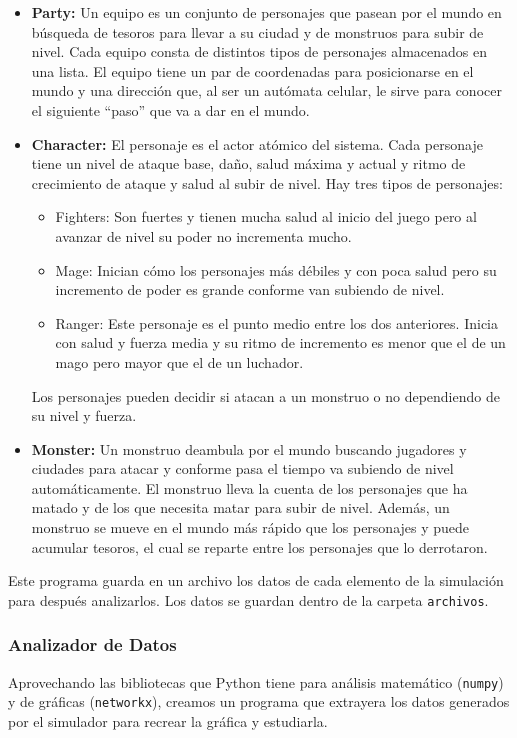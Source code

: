 {{\begin{itemize}
{            cuándo salen a buscar tesoros.
        }
        \item{\textbf{Party: }Un equipo es un conjunto de personajes que pasean
            por el mundo en búsqueda de tesoros para llevar a su ciudad y de
            monstruos para subir de nivel. Cada equipo consta de distintos
            tipos de personajes almacenados en una lista. El equipo tiene un par
            de coordenadas para posicionarse en el mundo y una dirección que, al
            ser un autómata celular, le sirve para conocer el siguiente ``paso''
            que va a dar en el mundo.
        }
        \item{\textbf{Character: }El personaje es el actor atómico del sistema.
            Cada personaje tiene un nivel de ataque base, daño, salud máxima y
            actual y ritmo de crecimiento de ataque y salud al subir de nivel.
            Hay tres tipos de personajes:
            \begin{itemize}
            \item{Fighters: Son fuertes y tienen mucha salud al inicio del
                juego pero al avanzar de nivel su poder no incrementa mucho.
            }
            \item{Mage: Inician cómo los personajes más débiles y con poca
                salud pero su incremento de poder es grande conforme van
                subiendo de nivel.
            }
            \item{Ranger: Este personaje es el punto medio entre los dos
                anteriores. Inicia con salud y fuerza media y su ritmo de
                incremento es menor que el de un mago pero mayor que el de un
                luchador.
            }
            \end{itemize}
            Los personajes pueden decidir si atacan a un monstruo o no
            dependiendo de su nivel y fuerza.
        }
        \item{\textbf{Monster: }Un monstruo deambula por el mundo buscando
            jugadores y ciudades para atacar y conforme pasa el tiempo va
            subiendo de nivel automáticamente. El monstruo lleva la cuenta de
            los personajes que ha matado y de los que necesita matar para subir
            de nivel. Además, un monstruo se mueve en el mundo más rápido que
            los personajes y puede acumular tesoros, el cual se reparte entre
            los personajes que lo derrotaron.
        }
        \end{itemize}

        Este programa guarda en un archivo los datos de cada elemento de la
        simulación para después analizarlos. Los datos se guardan dentro de la
        carpeta \texttt{archivos}.
    }
    \subsubsection*{Analizador de Datos}{
        Aprovechando las bibliotecas que Python tiene para análisis matemático
        (\texttt{numpy}) y de gráficas (\texttt{networkx}), creamos un programa
        que extrayera los datos generados por el simulador para recrear la
        gráfica y estudiarla.
    }
}

